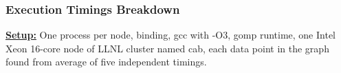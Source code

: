 \begin{frame}[label=execTimings]
\frametitle{Execution Timings Breakdown}
{\tiny \textbf{\underline{Setup:}} One process per node, binding, gcc
with -O3, gomp runtime, one Intel Xeon 16-core node of LLNL cluster
named cab, each data point in the graph found from average of five independent timings.}\\



\end{frame}
